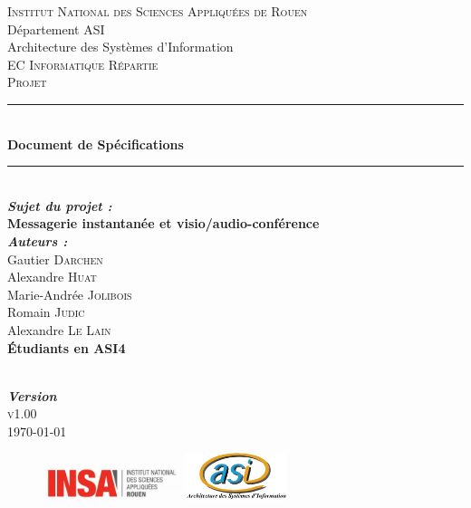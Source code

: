 \documentclass[11pt,dvipsnames,svgnames]{report}
\begin{document}
\begin{titlepage}
\newcommand{\HRule}{\rule{\linewidth}{0.5mm}} 
\center 
{}\textsc{\huge Institut National des Sciences Appliquées de Rouen}\\[0.7cm] 
\LARGE Département ASI~\\[0.5cm]
\Large{Architecture des Systèmes d'Information} ~\\[1.5cm]
\textsc{\Large EC Informatique Répartie}\\[0.5cm] 
\textsc{\large Projet}\\[0.8cm]

\HRule \\[0.4cm]
{ \huge \bfseries Document de Spécifications}\\[0.2cm] \HRule \\[1.5cm]
 
\LARGE \emph{\textbf{Sujet du projet :}} \\
\textbf{Messagerie instantanée et visio/audio-conférence}\\[1.3cm]

\large
	\emph{\textbf{Auteurs :}}\\
	Gautier \textsc{Darchen} \\ 
	Alexandre \textsc{Huat} \\ 
	Marie-Andrée \textsc{Jolibois} \\ 
	Romain \textsc{Judic} \\ 
	Alexandre \textsc{Le Lain}\\[0.3cm]
	\textbf{Étudiants en ASI4}
	
~\\[0.5cm]
\Large \emph{\textbf{Version}}\\
	\textsc{v1.00}
~\\[1cm]

\vfill{\today} 

\begin{figure}
\includegraphics[width=4cm]{images/LogoINSA.png}\hfill
\includegraphics[width=3cm]{images/logoasi.png}
\end{figure}


 \end{titlepage}
\end{document}
